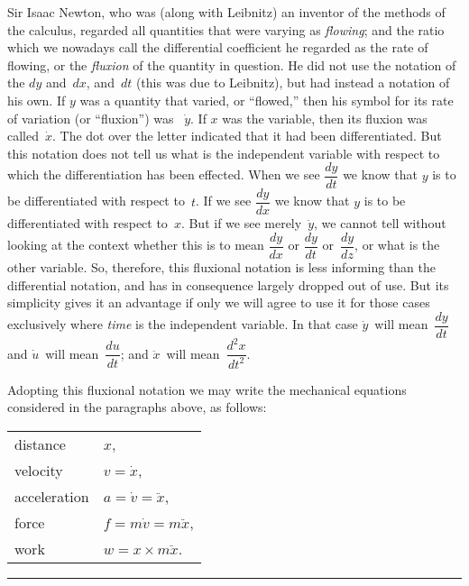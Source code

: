 \documentclass[12pt]{book}[2005/09/16]
\newcommand{\DPPageSep}[2]{\Pagelabel{#2}}
\newcommand{\Pagelabel}[1]
  {\phantomsection\label{#1}}
\newcommand{\tb}[1][1.5in]{%
  \pagebreak[0]\par{\centering\rule{#1}{0.5pt}\pagebreak[3]\par}%
}
\newcommand{\DPtypo}[2]{#2}%
\newcommand{\DPnote}[1]{}%
\begin{document}
Sir Isaac Newton, who was (along with Leibnitz)\DPnote{** [sic], not Leibniz}
an inventor of the methods of the calculus, regarded
all quantities that were varying as \emph{flowing}; and the
ratio which we nowadays call the differential coefficient
he regarded as the rate of flowing, or the
\emph{fluxion} of the quantity in question. He did not use
the notation of the $dy$ and~$dx$, and~$dt$ (this was due
to Leibnitz), but had instead a notation of his own.
If $y$ was a quantity that varied, or ``flowed,'' then his
symbol for its rate of variation (or ``fluxion'') was~%
\DPPageSep{071.png}{59}%
$\dot{y}$. If $x$ was the variable, then its fluxion was called~$\dot{x}$.
The dot over the letter indicated that it had been
differentiated. But this notation does not tell us
what is the independent variable with respect to
which the differentiation has been effected. When
we see $\dfrac{dy}{dt}$ we know that $y$ is to be differentiated with
respect to~$t$. If we see $\dfrac{dy}{dx}$ we know that $y$ is to be
differentiated with respect to~$x$. But if we see merely~$\dot{y}$,
we cannot tell without looking at the context
whether this is to mean $\dfrac{dy}{dx}$ or $\dfrac{dy}{dt}$ or~$\dfrac{dy}{dz}$, or what is
the other variable. So, therefore, this fluxional notation
is less informing than the differential notation,
and has in consequence largely dropped out of use.
But its simplicity gives it an advantage if only we
will agree to use it for those cases exclusively where
\emph{time} is the independent variable. In that case $\dot{y}$~will
mean~$\dfrac{dy}{dt}$ and $\dot{u}$~will mean~$\dfrac{du}{dt}$;
and $\ddot{x}$~will mean~$\dfrac{d^2x}{dt^2}$.

Adopting this fluxional notation we may write the
mechanical equations considered in the paragraphs
above, as follows:
\begin{center}
\begin{tabular}{l@{\qquad\qquad}l}
distance     &  $x$\DPtypo{}{,} \\
velocity     &  $v = \dot{x}$, \\
acceleration &  $a = \dot{v} = \ddot{x}$, \\
force        &  $f = m\dot{v} = m\ddot{x}$, \\
work         &  $w = x × m \ddot{x}$.
\end{tabular}
\end{center}

\tb
\DPPageSep{072.png}{60}%
\end{document}
